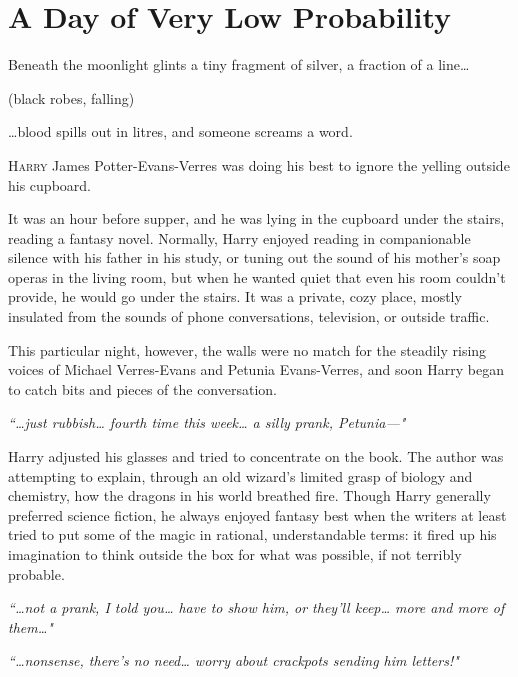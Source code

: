 \chapter{A Day of Very Low Probability}

\begin{chapterOpeningQuote}
\noindent
Beneath the moonlight glints a tiny fragment of silver, a fraction of a line{\ldots}

\vspace*{2ex}
(black robes, falling)

\vspace*{2ex}
{\ldots}blood spills out in litres, and someone screams a word.
\end{chapterOpeningQuote}

\lettrine{H}{arry} James Potter-Evans-Verres was doing his best to ignore the yelling outside his cupboard.

It was an hour before supper, and he was lying in the cupboard under the stairs, reading a fantasy novel. Normally, Harry enjoyed reading in companionable silence with his father in his study, or tuning out the sound of his mother's soap operas in the living room, but when he wanted quiet that even his room couldn't provide, he would go under the stairs. It was a private, cozy place, mostly insulated from the sounds of phone conversations, television, or outside traffic.

This particular night, however, the walls were no match for the steadily rising voices of Michael Verres-Evans and Petunia Evans-Verres, and soon Harry began to catch bits and pieces of the conversation.

\emph{``{\ldots}just rubbish{\ldots} fourth time this week{\ldots} a silly prank, Petunia---"}

Harry adjusted his glasses and tried to concentrate on the book. The author was attempting to explain, through an old wizard's limited grasp of biology and chemistry, how the dragons in his world breathed fire. Though Harry generally preferred science fiction, he always enjoyed fantasy best when the writers at least tried to put some of the magic in rational, understandable terms: it fired up his imagination to think outside the box for what was possible, if not terribly probable.

\emph{``{\ldots}not a prank, I told you{\ldots} have to show him, or they'll keep{\ldots} more and more of them{\ldots}"}

\emph{``{\ldots}nonsense, there's no need{\ldots} worry about crackpots sending him letters!"}

